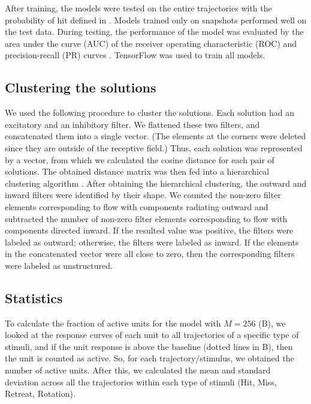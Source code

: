 \documentclass[pdftex,9pt,lineno]{elife}
\begin{document}
After training, the models were tested on the entire trajectories with the probability of hit defined in . Models trained only on snapshots performed well on the test data. During testing, the performance of the model was evaluated by the area under the curve (AUC) of the receiver operating characteristic (ROC) and precision-recall (PR) curves \citep{hanley1982meaning,davis2006relationship}.
TensorFlow \citep{abadi2016tensorflow} was used to train all models.

\subsection{Clustering the solutions}
We used the following procedure to cluster the solutions. Each solution had an excitatory and an inhibitory filter. We flattened these two filters, and concatenated them into a single vector. (The elements at the corners were deleted since they are outside of the receptive field.) Thus, each solution was represented by a vector, from which we calculated the cosine distance for each pair of solutions. The obtained distance matrix was then fed into a hierarchical clustering algorithm \citep{2020SciPy-NMeth}. After obtaining the hierarchical clustering, the outward and inward filters were identified by their shape. We counted the non-zero filter elements corresponding to flow with components radiating outward and subtracted the number of non-zero filter elements corresponding to flow with components directed inward. If the resulted value was positive, the filters were labeled as outward; otherwise, the filters were labeled as inward. If the elements in the concatenated vector were all close to zero, then the corresponding filters were labeled as unstructured.

\subsection{Statistics}
To calculate the fraction of active units for the model with $M=256$ (B), we looked at the response curves of each unit to all trajectories of a specific type of stimuli, and if the unit response is above the baseline (dotted lines in B), then the unit is counted as active. So, for each trajectory/stimulus, we obtained the number of active units. After this, we calculated the mean and standard deviation across all the trajectories within each type of stimuli (Hit, Miss, Retreat, Rotation).
\end{document}
